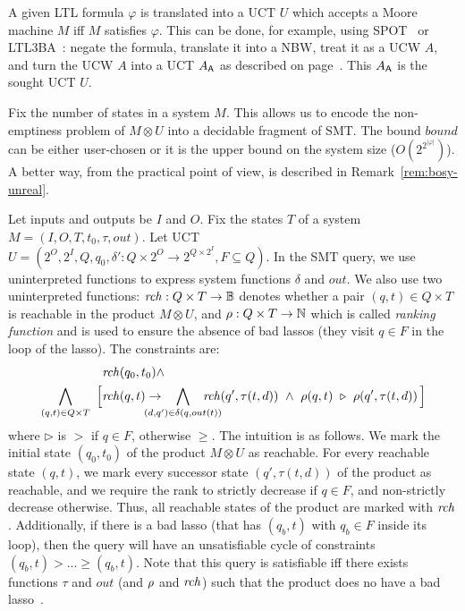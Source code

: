 A given LTL formula $\varphi$
is translated into a UCT $U$ which accepts a Moore machine $M$ iff $M$ satisfies $\varphi$.
This can be done, for example, using SPOT~\cite{spot} or LTL3BA~\cite{LTL3BA}:
negate the formula,
translate it into a NBW,
treat it as a UCW $A$, and turn the UCW $A$ into a UCT $A_{\operatorname{\mathsf{A}}}$ as described
on page~\pageref{page:defs:tree_variants}.
This $A_{\operatorname{\mathsf{A}}}$ is the sought UCT $U$.

Fix the number of states in a system $M$.
This allows us to encode the non-emptiness problem of $M \otimes U$ into a decidable fragment of SMT.
The bound $bound$ can be either user-chosen or it is the upper bound on the system size ($O(2^{2^{|\varphi|}})$).
A better way, from the practical point of view, is described in Remark~\ref{rem:bosy-unreal}.

Let inputs and outputs be $I$ and $O$.
Fix the states $T$ of a system $M=(I,O,T,t_0,\tau,out)$.
Let UCT $U = (2^O, 2^I, Q,q_0, \delta': Q\times 2^O \to 2^{Q\times 2^I}, F \subseteq Q)$.
In the SMT query, we use uninterpreted functions to express system functions $\delta$ and $out$.
We also use two uninterpreted functions:
$\mathit{rch}: Q\times T \to \mathbb{B}$ denotes
whether a pair $(q,t) \in Q \times T$ is reachable in the product $M\otimes U$,
and $\rho: Q \times T \to \mathbb{N}$ which is called \emph{ranking function} and is used
to ensure the absence of bad lassos
(they visit $q \in F$ in the loop of the lasso).
The constraints are:
\begin{equation}\label{defs:eq:bs}
\begin{aligned}
&\reach(q_0,t_0) \land \\
\bigwedge_{(q,t) \in Q\times T} ~\Big[ &\reach(q,t) \impl
\!\!\!\!\!\!\!\!\!\!\bigwedge_{(d,q') \in \delta(q,out(t))} \!\!\!\!\!\!\!\!\!\!
\reach\!\left(q',\tau(t,d)\right) ~\land~ \rank(q,t) ~\triangleright~ \rank\!\left(q',\tau(t,d)\right)\Big]
\end{aligned}
\end{equation}
where $\triangleright$ is $>$ if $q \in F$, otherwise $\geq$.
The intuition is as follows.
We mark the initial state $(q_0,t_0)$ of the product $M\otimes U$ as reachable.
For every reachable state $(q,t)$,
we mark every successor state $(q',\tau(t,d))$ of the product as reachable,
and we require the rank to strictly decrease if $q \in F$, and non-strictly decrease otherwise.
Thus, all reachable states of the product are marked with $\mathit{rch}$.
Additionally,
if there is a bad lasso (that has $(q_b,t)$ with $q_b \in F$ inside its loop),
then the query will have an unsatisfiable cycle of constraints $(q_b,t) > ... \geq (q_b,t)$.
Note that this query is satisfiable iff there exists functions $\tau$ and $out$
(and $\rho$ and $\mathit{rch}$) such that the product does no have a bad lasso~\cite{BS}.

